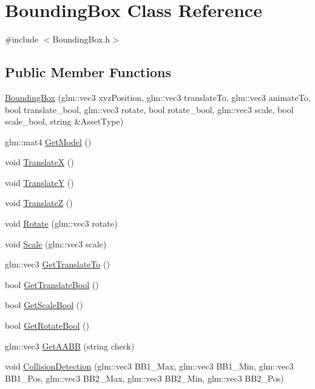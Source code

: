 \hypertarget{class_bounding_box}{}\section{Bounding\+Box Class Reference}
\label{class_bounding_box}


{\ttfamily \#include $<$Bounding\+Box.\+h$>$}

\subsection*{Public Member Functions}
\begin{DoxyCompactItemize}
\item 
\hyperlink{class_bounding_box_ab5c42370640606c132b4b797cb0c7c2f}{Bounding\+Box} (glm\+::vec3 xyz\+Position, glm\+::vec3 translate\+To, glm\+::vec3 animate\+To, bool translate\+\_\+bool, glm\+::vec3 rotate, bool rotate\+\_\+bool, glm\+::vec3 scale, bool scale\+\_\+bool, string \&Asset\+Type)
\item 
glm\+::mat4 \hyperlink{class_bounding_box_a5fd1769f7157e7df40a6ab6a242fcfcc}{Get\+Model} ()
\item 
void \hyperlink{class_bounding_box_a9898275b1cd97761855156fc965412b1}{Translate\+X} ()
\item 
void \hyperlink{class_bounding_box_aedff87fb2721b1e706e6e033e35b676b}{Translate\+Y} ()
\item 
void \hyperlink{class_bounding_box_a33d133625c7a1a6f6dd7628f00388fd5}{Translate\+Z} ()
\item 
void \hyperlink{class_bounding_box_a728a3700574a5d9fbcac6d94561336ed}{Rotate} (glm\+::vec3 rotate)
\item 
void \hyperlink{class_bounding_box_ab84e48c88a509b20a469ccf5e23c4f11}{Scale} (glm\+::vec3 scale)
\item 
glm\+::vec3 \hyperlink{class_bounding_box_a45332d45575fe93b516267436abcd4fe}{Get\+Translate\+To} ()
\item 
bool \hyperlink{class_bounding_box_a501c1fd40b00ce6295fd60e1ed8cd92c}{Get\+Translate\+Bool} ()
\item 
bool \hyperlink{class_bounding_box_a262907e4b68e555edc57b21faef5685b}{Get\+Scale\+Bool} ()
\item 
bool \hyperlink{class_bounding_box_a6686a674cd3de57c987bccdfe6acbe92}{Get\+Rotate\+Bool} ()
\item 
glm\+::vec3 \hyperlink{class_bounding_box_a9d1fe341d5c2033e7f20ab9bdb4ae4b9}{Get\+A\+A\+B\+B} (string check)
\item 
void \hyperlink{class_bounding_box_a158978699951663552a2936f2a8a2339}{Collision\+Detection} (glm\+::vec3 B\+B1\+\_\+\+Max, glm\+::vec3 B\+B1\+\_\+\+Min, glm\+::vec3 B\+B1\+\_\+\+Pos, glm\+::vec3 B\+B2\+\_\+\+Max, glm\+::vec3 B\+B2\+\_\+\+Min, glm\+::vec3 B\+B2\+\_\+\+Pos)
\end{DoxyCompactItemize}


